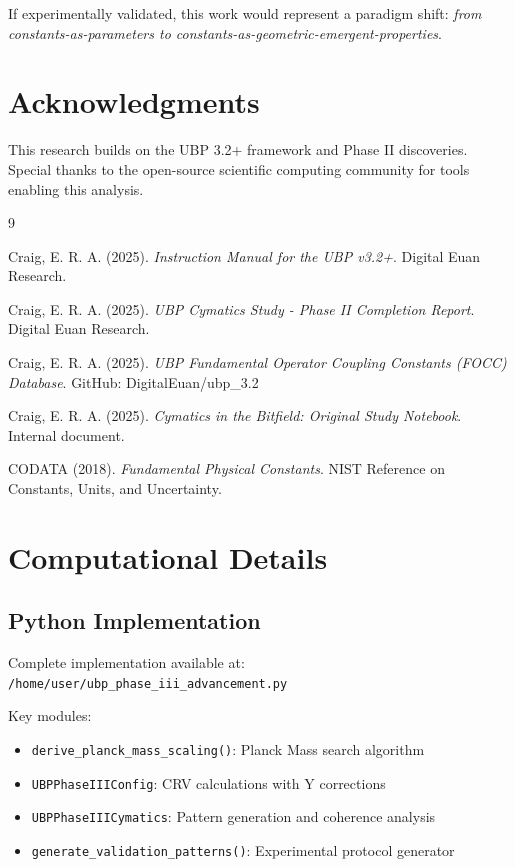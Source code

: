 \documentclass[11pt,a4paper]{article}
\begin{document}
If experimentally validated, this work would represent a paradigm shift: \emph{from constants-as-parameters to constants-as-geometric-emergent-properties}.

\section*{Acknowledgments}

This research builds on the UBP 3.2+ framework and Phase II discoveries. Special thanks to the open-source scientific computing community for tools enabling this analysis.

\begin{thebibliography}{9}

Craig, E. R. A. (2025). 
\emph{Instruction Manual for the UBP v3.2+}. 
Digital Euan Research.

Craig, E. R. A. (2025). 
\emph{UBP Cymatics Study - Phase II Completion Report}. 
Digital Euan Research.

Craig, E. R. A. (2025). 
\emph{UBP Fundamental Operator Coupling Constants (FOCC) Database}. 
GitHub: DigitalEuan/ubp\_3.2

Craig, E. R. A. (2025). 
\emph{Cymatics in the Bitfield: Original Study Notebook}. 
Internal document.

CODATA (2018). 
\emph{Fundamental Physical Constants}. 
NIST Reference on Constants, Units, and Uncertainty.

\end{thebibliography}

\appendix

\section{Computational Details}

\subsection{Python Implementation}

Complete implementation available at: \texttt{/home/user/ubp\_phase\_iii\_advancement.py}

Key modules:
\begin{itemize}
    \item \texttt{derive\_planck\_mass\_scaling()}: Planck Mass search algorithm
    \item \texttt{UBPPhaseIIIConfig}: CRV calculations with Y corrections
    \item \texttt{UBPPhaseIIICymatics}: Pattern generation and coherence analysis
    \item \texttt{generate\_validation\_patterns()}: Experimental protocol generator
\end{itemize}
\end{document}
